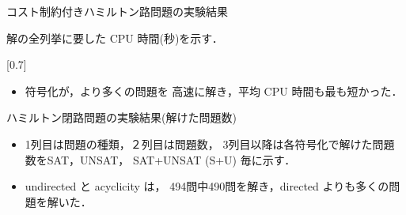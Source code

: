 \documentclass[dvipdfmx]{beamer}
\begin{document}
\begin{frame}{コスト制約付きハミルトン路問題の実験結果}

\begin{block}{}\centering
  解の全列挙に要した CPU 時間(秒)を示す．
\end{block}

\begin{center}
  \scalebox{0.7}[0.7]{
    
  }
\end{center}


\begin{itemize}
\item {} 符号化が，より多くの問題を
  高速に解き，平均 CPU 時間も最も短かった．
\end{itemize}  
\end{frame}
\begin{frame}{ハミルトン閉路問題の実験結果(解けた問題数)}

\begin{itemize}
\item 1列目は問題の種類，２列目は問題数，
  3列目以降は各符号化で解けた問題数を\textsf{SAT}，\textsf{UNSAT}，
  \textsf{SAT+UNSAT} (\textsf{S+U}) 毎に示す．
\item \textsf{undirected} と \textsf{acyclicity} は，
  494問中490問を解き，\textsf{directed} よりも多くの問題を解いた．
\end{itemize}
\end{frame}
\end{document}
